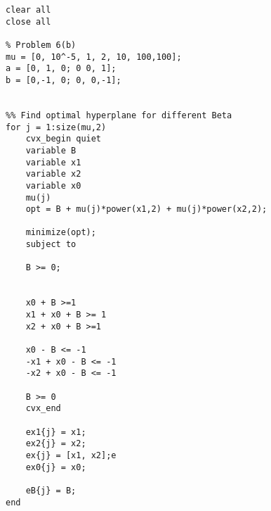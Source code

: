 \documentclass{article} %
\begin{document}
\begin{enumerate}
\begin{itemize}
\begin{lstlisting}
clear all
close all

% Problem 6(b)
mu = [0, 10^-5, 1, 2, 10, 100,100];
a = [0, 1, 0; 0 0, 1];
b = [0,-1, 0; 0, 0,-1];


%% Find optimal hyperplane for different Beta
for j = 1:size(mu,2)
    cvx_begin quiet
    variable B
    variable x1
    variable x2
    variable x0
    mu(j)
    opt = B + mu(j)*power(x1,2) + mu(j)*power(x2,2);
    
    minimize(opt);
    subject to
    
    B >= 0;
    
    
    x0 + B >=1
    x1 + x0 + B >= 1
    x2 + x0 + B >=1
    
    x0 - B <= -1
    -x1 + x0 - B <= -1
    -x2 + x0 - B <= -1
    
    B >= 0
    cvx_end
    
    ex1{j} = x1;
    ex2{j} = x2;
    ex{j} = [x1, x2];e
    ex0{j} = x0;
    
    eB{j} = B;
end

\end{lstlisting}










\end{itemize}
\end{enumerate}
\end{document}
